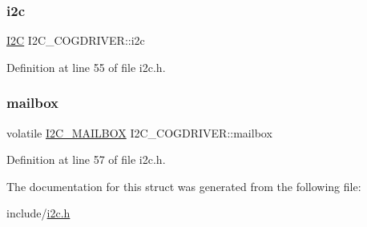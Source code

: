 \subsubsection{\texorpdfstring{i2c}{i2c}}
{\footnotesize\ttfamily \mbox{\hyperlink{structI2C}{I2C}} I2\+C\+\_\+\+C\+O\+G\+D\+R\+I\+V\+E\+R\+::i2c}



Definition at line 55 of file i2c.\+h.

\mbox{\label{structI2C__COGDRIVER_a374bc1136f0881998dea2a4076e737d4}} 
\subsubsection{\texorpdfstring{mailbox}{mailbox}}
{\footnotesize\ttfamily volatile \mbox{\hyperlink{structI2C__MAILBOX}{I2\+C\+\_\+\+M\+A\+I\+L\+B\+OX}} I2\+C\+\_\+\+C\+O\+G\+D\+R\+I\+V\+E\+R\+::mailbox}



Definition at line 57 of file i2c.\+h.



The documentation for this struct was generated from the following file\+:\begin{DoxyCompactItemize}
\item 
include/\mbox{\hyperlink{i2c_8h}{i2c.\+h}}\end{DoxyCompactItemize}
